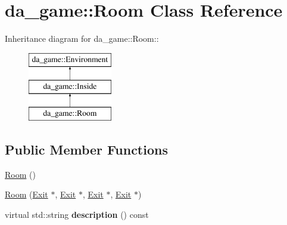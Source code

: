 \hypertarget{classda__game_1_1Room}{
\section{da\_\-game::Room Class Reference}
\label{classda__game_1_1Room}
}
Inheritance diagram for da\_\-game::Room::\begin{figure}[H]
\begin{center}
\leavevmode
\includegraphics[height=3cm]{classda__game_1_1Room}
\end{center}
\end{figure}
\subsection*{Public Member Functions}
\begin{DoxyCompactItemize}
\item 
\hyperlink{classda__game_1_1Room_aa36091a4e06c697468cd4e48da7d94c1}{Room} ()
\item 
\hyperlink{classda__game_1_1Room_ac8abf8b2bb0499d4008859ba8a5bb3d3}{Room} (\hyperlink{classda__game_1_1Exit}{Exit} $\ast$, \hyperlink{classda__game_1_1Exit}{Exit} $\ast$, \hyperlink{classda__game_1_1Exit}{Exit} $\ast$, \hyperlink{classda__game_1_1Exit}{Exit} $\ast$)
\item 
\hypertarget{classda__game_1_1Room_a7fabe80fe90a22324aeda1aa3a315903}{
virtual std::string {\bfseries description} () const }
\label{classda__game_1_1Room_a7fabe80fe90a22324aeda1aa3a315903}

\end{DoxyCompactItemize}


